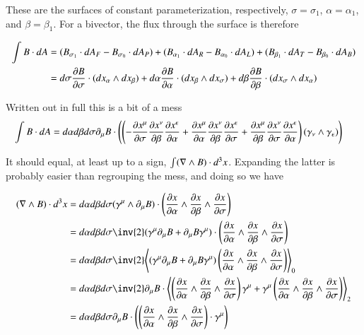 These are the surfaces of constant parameterization, respectively, $\sigma = \sigma_1$, $\alpha = \alpha_1$, and $\beta = \beta_1$.  For a bivector, the flux through the surface is therefore

\begin{align*}
\int B \cdot dA 
&=
(B_{\sigma_1} \cdot dA_F - B_{\sigma_0} \cdot dA_P )
+ (B_{\alpha_1} \cdot dA_R - B_{\alpha_0} \cdot dA_L)
+ (B_{\beta_1} \cdot dA_T - B_{\beta_0} \cdot dA_B) \\
&=
d \sigma \frac{\partial {B}}{\partial {\sigma}} \cdot (dx_\alpha \wedge dx_\beta )
+ d \alpha \frac{\partial {B}}{\partial {\alpha}} \cdot (dx_\beta \wedge dx_\sigma) 
+ d \beta \frac{\partial {B}}{\partial {\beta}} \cdot (dx_\sigma \wedge dx_\alpha ) \\
\end{align*}

Written out in full this is a bit of a mess
\begin{align}\label{eqn:mess}
\int B \cdot dA 
&=
d \alpha d\beta d\sigma 
\partial_\mu B \cdot
\left(
\left(
- \frac{\partial {x^\mu}}{\partial {\sigma}} \frac{\partial {x^\nu}}{\partial {\beta}} \frac{\partial {x^\epsilon}}{\partial {\alpha}} 
+ \frac{\partial {x^\mu}}{\partial {\alpha}} \frac{\partial {x^\nu}}{\partial {\beta}} \frac{\partial {x^\epsilon}}{\partial {\sigma}} 
+ \frac{\partial {x^\mu}}{\partial {\beta}} \frac{\partial {x^\nu}}{\partial {\sigma}} \frac{\partial {x^\epsilon}}{\partial {\alpha}} 
\right) 
(\gamma_\nu \wedge \gamma_\epsilon )
\right) 
\end{align}

It should equal, at least up to a sign, $\int (\nabla \wedge B) \cdot d^3 x$.  Expanding the latter is probably easier than regrouping the mess, and doing so we have

\begin{align*}
(\grad \wedge B) \cdot d^3 x
&=
d\alpha d\beta d\sigma ( \gamma^\mu \wedge \partial_\mu B)  \cdot \left( \PD{\alpha}{x} \wedge \PD{\beta}{x} \wedge \PD{\sigma}{x} \right) \\
&= 
d\alpha d\beta d\sigma \inv{2} ( \gamma^\mu \partial_\mu B + \partial_\mu B \gamma^\mu )  \cdot \left( \PD{\alpha}{x} \wedge \PD{\beta}{x} \wedge \PD{\sigma}{x} \right) \\
&=
d\alpha d\beta d\sigma \inv{2} \gpgradezero{
( \gamma^\mu \partial_\mu B + \partial_\mu B \gamma^\mu )  \left( \PD{\alpha}{x} \wedge \PD{\beta}{x} \wedge \PD{\sigma}{x} \right) }
\\
&=
d\alpha d\beta d\sigma \inv{2} 
\partial_\mu B \cdot
\gpgradetwo{
\left( \PD{\alpha}{x} \wedge \PD{\beta}{x} \wedge \PD{\sigma}{x} \right) \gamma^\mu 
+ \gamma^\mu \left( \PD{\alpha}{x} \wedge \PD{\beta}{x} \wedge \PD{\sigma}{x} \right) }
\\
&=
d\alpha d\beta d\sigma 
\partial_\mu B \cdot
\left( \left( \PD{\alpha}{x} \wedge \PD{\beta}{x} \wedge \PD{\sigma}{x} \right) \cdot \gamma^\mu \right)
\\
\end{align*}

